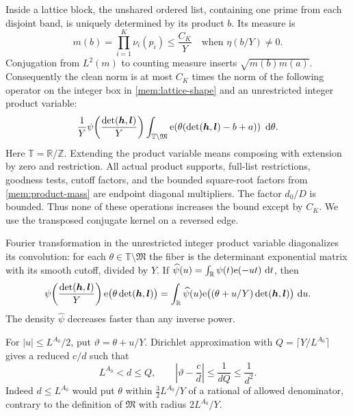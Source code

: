 Inside a lattice block, the unshared ordered list, containing one
prime from each disjoint band, is uniquely determined by its product
$b$. Its measure is
\begin{equation}\label{mem:product-mass}
 m(b)=\prod_{i=1}^K\nu_i(p_i)\le\frac{C_K}{Y}
 \quad\text{when }\eta(b/Y)\ne0.
\end{equation}
Conjugation from $L^2(m)$ to counting measure inserts
$\sqrt{m(b)m(a)}$. Consequently the clean norm is at most $C_K$ times
the norm of the following operator on the integer box in
\eqref{mem:lattice-shape} and an unrestricted integer product variable:
\begin{equation}\label{mem:clean-kernel}
 \frac1Y\psi\!\left(\frac{\det(\boldsymbol h,\boldsymbol l)}Y\right)
 \int_{\mathbb T\setminus\mathfrak M}
 \mathrm{e}\!\left(\theta
      (\det(\boldsymbol h,\boldsymbol l)-b+a)\right)\,\,\mathrm d\theta.
\end{equation}
Here $\mathbb T=\mathbb R/\mathbb Z$. Extending the product variable
means composing with extension by zero and restriction. All actual
product supports, full-list restrictions, goodness tests, cutoff
factors, and the bounded square-root factors from
\eqref{mem:product-mass} are endpoint diagonal multipliers. The factor
$d_0/D$ is bounded. Thus none of these operations increases the bound
except by $C_K$. We use the transposed conjugate kernel on a reversed
edge.

Fourier transformation in the unrestricted integer product variable
diagonalizes its convolution: for each
$\theta\in\mathbb T\setminus\mathfrak M$ the fiber is the determinant
exponential matrix with its smooth cutoff, divided by $Y$. If
$\widehat\psi(u)=\int_{\mathbb R}\psi(t)\mathrm{e}(-ut)\,\,\mathrm d t$, then
\begin{equation}\label{mem:cutoff-fourier}
 \psi\!\left(\frac{\det(\boldsymbol h,\boldsymbol l)}Y\right)
 \mathrm{e}\bigl(\theta\det(\boldsymbol h,\boldsymbol l)\bigr)
 =\int_{\mathbb R}\widehat\psi(u)
   \mathrm{e}\bigl((\theta+u/Y)\det(\boldsymbol h,\boldsymbol l)\bigr)
   \,\,\mathrm d u.
\end{equation}
The density $\widehat\psi$ decreases faster than any inverse power.

For $|u|\le L^{A_0}/2$, put $\vartheta=\theta+u/Y$. Dirichlet
approximation with $Q=\lceil Y/L^{A_0}\rceil$ gives a reduced
$c/d$ such that
\begin{equation}\label{mem:dirichlet-minor}
 L^{A_0}<d\le Q,\qquad
 \left|\vartheta-\frac cd\right|
        \le\frac1{dQ}\le\frac1{d^2}.
\end{equation}
Indeed $d\le L^{A_0}$ would put $\theta$ within
$\tfrac32L^{A_0}/Y$ of a rational of allowed denominator, contrary
to the definition of $\mathfrak M$ with radius $2L^{A_0}/Y$.

